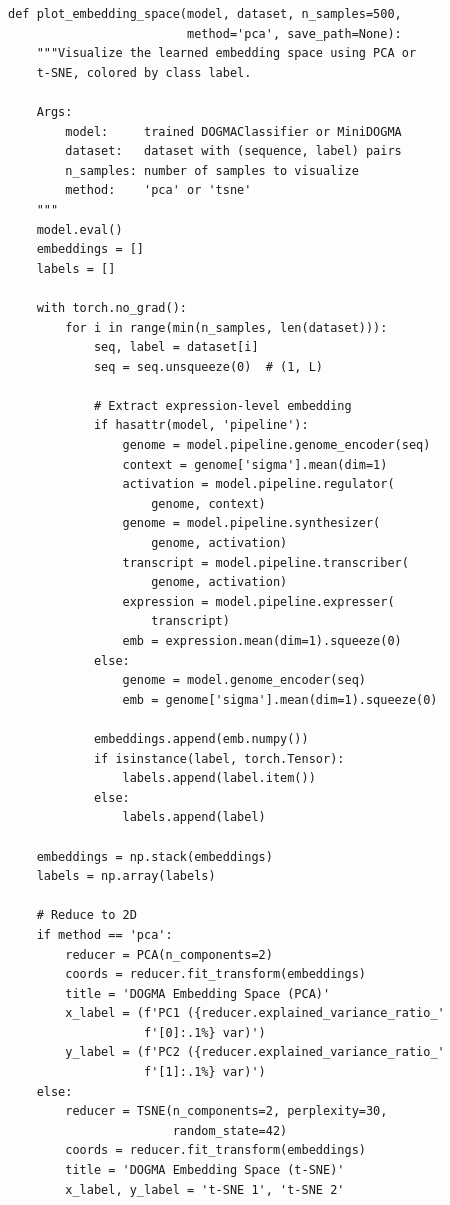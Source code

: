 \begin{lstlisting}[style=dogmapython, caption={Lab 8: PCA and t-SNE visualization of embeddings.}]
def plot_embedding_space(model, dataset, n_samples=500,
                         method='pca', save_path=None):
    """Visualize the learned embedding space using PCA or
    t-SNE, colored by class label.

    Args:
        model:     trained DOGMAClassifier or MiniDOGMA
        dataset:   dataset with (sequence, label) pairs
        n_samples: number of samples to visualize
        method:    'pca' or 'tsne'
    """
    model.eval()
    embeddings = []
    labels = []

    with torch.no_grad():
        for i in range(min(n_samples, len(dataset))):
            seq, label = dataset[i]
            seq = seq.unsqueeze(0)  # (1, L)

            # Extract expression-level embedding
            if hasattr(model, 'pipeline'):
                genome = model.pipeline.genome_encoder(seq)
                context = genome['sigma'].mean(dim=1)
                activation = model.pipeline.regulator(
                    genome, context)
                genome = model.pipeline.synthesizer(
                    genome, activation)
                transcript = model.pipeline.transcriber(
                    genome, activation)
                expression = model.pipeline.expresser(
                    transcript)
                emb = expression.mean(dim=1).squeeze(0)
            else:
                genome = model.genome_encoder(seq)
                emb = genome['sigma'].mean(dim=1).squeeze(0)

            embeddings.append(emb.numpy())
            if isinstance(label, torch.Tensor):
                labels.append(label.item())
            else:
                labels.append(label)

    embeddings = np.stack(embeddings)
    labels = np.array(labels)

    # Reduce to 2D
    if method == 'pca':
        reducer = PCA(n_components=2)
        coords = reducer.fit_transform(embeddings)
        title = 'DOGMA Embedding Space (PCA)'
        x_label = (f'PC1 ({reducer.explained_variance_ratio_'
                   f'[0]:.1%} var)')
        y_label = (f'PC2 ({reducer.explained_variance_ratio_'
                   f'[1]:.1%} var)')
    else:
        reducer = TSNE(n_components=2, perplexity=30,
                       random_state=42)
        coords = reducer.fit_transform(embeddings)
        title = 'DOGMA Embedding Space (t-SNE)'
        x_label, y_label = 't-SNE 1', 't-SNE 2'


\end{lstlisting}
